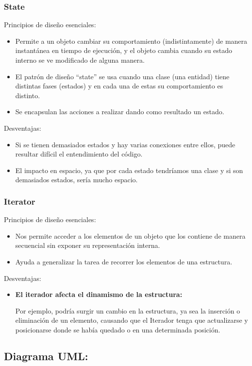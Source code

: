 \documentclass{article}
\begin{document}
\subsubsection*{State}
Principios de diseño esenciales:
\begin{itemize}
\item Permite a un objeto cambiar su comportamiento (indistintamente) de manera instantánea
  en tiempo de ejecución, y el objeto cambia cuando su estado interno se ve modificado de
  alguna manera.
\item El patrón de diseño “state” se usa cuando una clase (una entidad) tiene distintas fases
  (estados) y en cada una de estas su comportamiento es distinto.
\item Se encapsulan las acciones a realizar dando como resultado un estado.
\end{itemize}

Desventajas:
\begin{itemize}
\item Si se tienen demasiados estados y hay varias conexiones entre ellos, puede
  resultar difícil el entendimiento del código.
\item El impacto en espacio, ya que por cada estado tendríamos una clase y si son
  demasiados estados, sería mucho espacio.
\end{itemize}

\subsubsection*{Iterator}
Principios de diseño esenciales:
\begin{itemize}
\item Nos permite acceder a los elementos de un objeto que los contiene de manera
  secuencial sin exponer su representación interna.
\item Ayuda a generalizar la tarea de recorrer los elementos de una estructura.
\end{itemize}

Desventajas:
\begin{itemize}
\item \textbf{El iterador afecta el dinamismo de la estructura:}
  
  Por ejemplo, podría surgir un cambio en la estructura, ya sea la inserción
  o eliminación de un elemento, causando que el Iterador tenga que actualizarse
  y posicionarse donde se había quedado o en una determinada posición.
\end{itemize}

\subsection*{Diagrama UML:}
\end{document}
